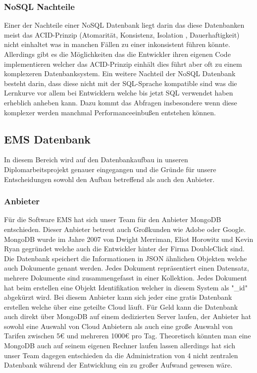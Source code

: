 \documentclass[12pt, letterpaper, twoside]{article}
\begin{document}
	\subsubsection{NoSQL Nachteile}
		Einer der Nachteile einer NoSQL Datenbank liegt darin das diese Datenbanken meist das ACID-Prinzip (Atomarität, Konsistenz, Isolation , Dauerhaftigkeit) nicht einhaltet was in manchen Fällen zu einer inkonsistent führen könnte. Allerdings gibt es die Möglichkeiten das die Entwickler ihren eigenen Code implementieren welcher das ACID-Prinzip einhält dies führt aber oft zu einem komplexeren Datenbanksystem. Ein weitere Nachteil der NoSQL Datenbank besteht darin, dass diese nicht mit der SQL-Sprache kompatible sind was die Lernkurve vor allem bei Entwicklern welche bis jetzt SQL verwendet haben erheblich anheben kann. Dazu kommt das Abfragen insbesondere wenn diese komplexer werden manchmal Performanceeinbußen entstehen können.
		
	\subsection{EMS Datenbank}
		In diesem Bereich wird auf den Datenbankaufbau in unseren Diplomarbeitsprojekt genauer eingegangen und die Gründe für unsere Entscheidungen sowohl den Aufbau betreffend als auch den Anbieter.
		
		\subsubsection{Anbieter}
			Für die Software EMS hat sich unser Team für den Anbieter MongoDB entschieden. Dieser Anbieter betreut auch Großkunden wie Adobe oder Google. MongoDB wurde im Jahre 2007 von Dwight Merriman, Eliot Horowitz und Kevin Ryan gegründet welche auch die Entwickler hinter der Firma DoubleClick sind. Die Datenbank speichert die Informationen in JSON ähnlichen Objekten welche auch Dokumente genant werden. Jedes Dokument repräsentiert einen Datensatz, mehrere Dokumente sind zusammengefasst in einer Kollektion. Jedes Dokument hat beim erstellen eine Objekt Identifikation welcher in diesem System als "\_id" abgekürzt wird. Bei diesem Anbieter kann sich jeder eine gratis Datenbank erstellen welche über eine geteilte Cloud läuft. Für Geld kann die Datenbank auch direkt über MongoDB auf einem dedizierten Server laufen, der Anbieter hat sowohl eine Auswahl von Cloud Anbietern als auch eine große Auswahl von Tarifen zwischen 5€ und mehreren 1000€ pro Tag. Theoretisch könnten man eine MongoDB auch auf seinem eigenen Rechner laufen lassen allerdings hat sich unser Team dagegen entschieden da die Administration von 4 nicht zentralen Datenbank während der Entwicklung ein zu großer Aufwand gewesen wäre.
		
\end{document}
